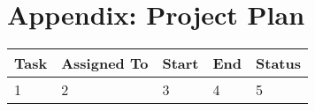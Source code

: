 %
\chapter{Appendix: Project Plan}\label{ch:appendix:-project-plan}

\begin{center}
    \begin{tabular}{|l|l|l|l|l|}
        \hline
        Task & Assigned To & Start & End & Status \\
        \hline
        1 & 2 & 3 & 4 & 5 \\
        \hline
    \end{tabular}
\end{center}
